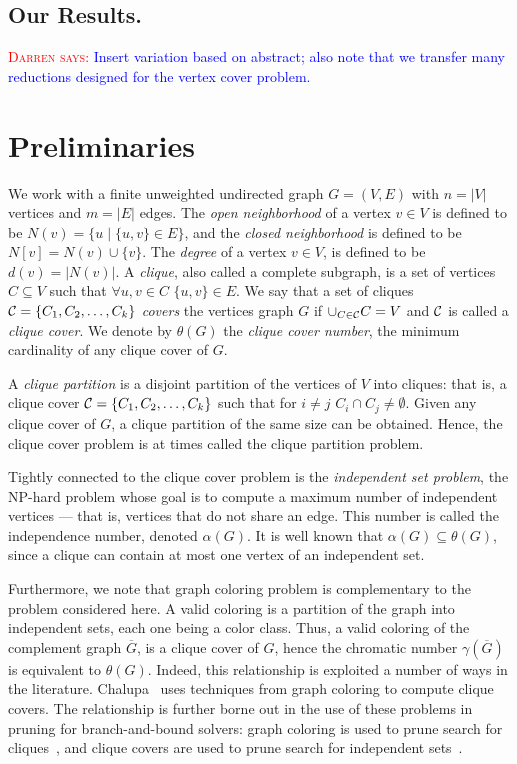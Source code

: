 \documentclass[sigconf]{acmart}
\newcommand{\niceremark}[3]{\textcolor{red}{\textsc{#1 #2: }}\textcolor{blue}{\textsf{#3}}}
\newcommand{\darren}[2][says]{\niceremark{Darren}{#1}{#2}}
\newcommand{\CC}[0]{{\ensuremath\mathcal{C}}}
\begin{document}
\subsection{Our Results.}
\darren{Insert variation based on abstract; also note that we transfer many reductions designed for the vertex cover problem.}

\section{Preliminaries}
\label{sec:Preliminaries}
We work with a finite unweighted undirected graph $G=(V,E)$ with $n = |V|$ vertices and $m=|E|$ edges. The \emph{open neighborhood} of a vertex $v\in V$ is defined to be $N(v)=\{u\mid \{u,v\}\in E\}$, and the \emph{closed neighborhood} is defined to be $N[v] = N(v)\cup\{v\}$. The \emph{degree} of a vertex $v\in V$, is defined to be $d(v) = |N(v)|$.
A \emph{clique}, also called a complete subgraph, is a set of vertices $C\subseteq V$ such that $\forall u,v\in C\,\,\{u,v\}\in E$. We say that a set of cliques $\CC=\{C_1,C_2,\ldots, C_k\}$ \emph{covers} the vertices graph $G$ if $\cup_{C\in\CC}C = V$ and $\CC$ is called a \emph{clique cover}. We denote by $\theta(G)$ the \emph{clique cover number}, the minimum cardinality of any clique cover of $G$.

A \emph{clique partition} is a disjoint partition of the vertices of $V$ into cliques: that is, a clique cover $\CC=\{C_1,C_2,\ldots,C_k\}$ such that for $i\neq j$ $C_i\cap C_j\neq \emptyset$. Given any clique cover of $G$, a clique partition of the same size can be obtained. Hence, the clique cover problem is at times called the clique partition problem.

Tightly connected to the clique cover problem is the \emph{independent set problem}, the NP-hard problem whose goal is to compute a maximum number of independent vertices --- that is, vertices that do not share an edge. This number is called the independence number, denoted $\alpha(G)$. It is well known that $\alpha(G)\subseteq \theta(G)$, since a clique can contain at most one vertex of an independent set.

Furthermore, we note that graph coloring problem is complementary to the problem considered here. A valid coloring is a partition of the graph into independent sets, each one being a color class. Thus, a valid coloring of the complement graph $\overline{G}$, is a clique cover of $G$, hence the chromatic number $\gamma(\overline{G})$ is equivalent to $\theta(G)$. Indeed, this relationship is exploited a number of ways in the literature. Chalupa~\cite{} uses techniques from graph coloring to compute clique covers. The relationship is further borne out in the use of these problems in pruning for branch-and-bound solvers: graph coloring is used to prune search for cliques~\cite{}, and clique covers are used to prune search for independent sets~\cite{}.
\end{document}
